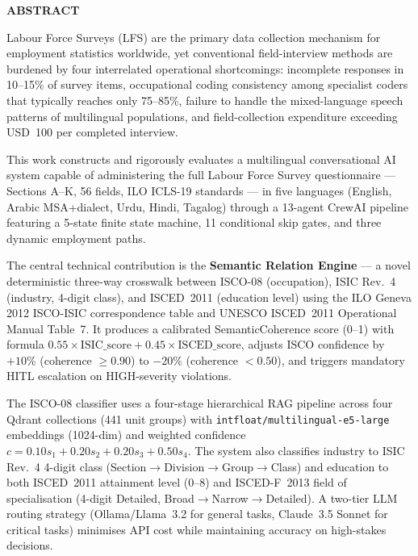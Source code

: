 \documentclass[12pt,a4wide]{report}
\theoremstyle{plain}
\theoremstyle{definition}
\theoremstyle{remark}
\begin{document}
\clearpage

\begin{center}
{\Large{\bf{ABSTRACT}}}
\end{center}

Labour Force Surveys (LFS) are the primary data collection mechanism for
employment statistics worldwide, yet conventional field-interview methods are burdened by four
interrelated operational shortcomings: incomplete responses in 10--15\% of
survey items, occupational coding consistency among specialist coders that
typically reaches only 75--85\%, failure to handle the mixed-language speech
patterns of multilingual populations, and field-collection expenditure exceeding
USD~100 per completed interview.

This work constructs and rigorously evaluates a multilingual conversational AI
system capable of administering the full Labour Force Survey questionnaire --- Sections A--K,
56 fields, ILO ICLS-19 standards --- in five languages (English, Arabic
MSA+dialect, Urdu, Hindi, Tagalog) through a 13-agent CrewAI pipeline
featuring a 5-state finite state machine, 11 conditional skip gates, and three
dynamic employment paths.

The central technical contribution is the \textbf{Semantic Relation Engine} ---
a novel deterministic three-way crosswalk between ISCO-08 (occupation),
ISIC Rev.~4 (industry, 4-digit class), and ISCED~2011 (education level)
using the ILO Geneva 2012 ISCO-ISIC correspondence table and UNESCO ISCED~2011
Operational Manual Table~7.
It produces a calibrated SemanticCoherence score (0--1) with formula
$0.55 \times \text{ISIC\_score} + 0.45 \times \text{ISCED\_score}$,
adjusts ISCO confidence by $+10\%$ (coherence $\geq 0.90$) to $-20\%$
(coherence $< 0.50$), and triggers mandatory HITL escalation on HIGH-severity
violations.

The ISCO-08 classifier uses a four-stage hierarchical RAG pipeline across
four Qdrant collections (441 unit groups) with
\texttt{intfloat/multilingual-e5-large} embeddings (1024-dim) and
weighted confidence $c = 0.10s_1 + 0.20s_2 + 0.20s_3 + 0.50s_4$.
The system also classifies industry to ISIC Rev.~4 4-digit class
(Section$\to$Division$\to$Group$\to$Class) and education to both ISCED~2011
attainment level (0--8) and ISCED-F~2013 field of specialisation
(4-digit Detailed, Broad$\to$Narrow$\to$Detailed).
A two-tier LLM routing strategy (Ollama/Llama~3.2 for general tasks,
Claude~3.5 Sonnet for critical tasks) minimises API cost while maintaining
accuracy on high-stakes decisions.
\end{document}
